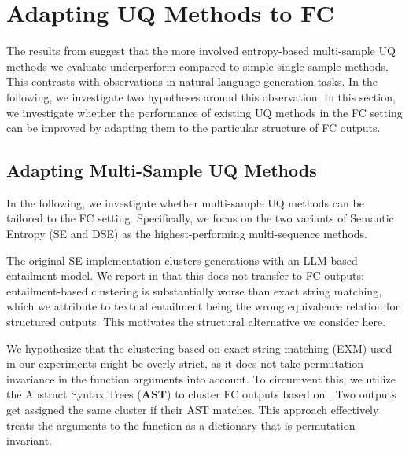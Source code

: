 \section{Adapting UQ Methods to FC}
\label{sec:discussion}


The results from  suggest that the more involved entropy-based multi-sample UQ methods we evaluate underperform compared to simple single-sample methods. 
This contrasts with observations in natural language generation tasks. 
In the following, we investigate two hypotheses around this observation. 
In this section, we investigate whether the performance of existing UQ methods in the FC setting can be improved by adapting them to the particular structure of FC outputs.









\subsection{Adapting Multi-Sample UQ Methods} 
\label{sec:SE_AST}

% 



In the following, we investigate whether multi-sample UQ methods can be tailored to the FC setting. Specifically, we focus on the two variants of Semantic Entropy (SE and DSE) as the highest-performing multi-sequence methods.

The original SE implementation clusters generations with an LLM-based entailment model. We report in  that this does not transfer to FC outputs: entailment-based clustering is substantially worse than exact string matching, which we attribute to textual entailment being the wrong equivalence relation for structured outputs. This motivates the structural alternative we consider here.

We hypothesize that the clustering based on exact string matching (EXM) used in our experiments might be overly strict, as it does not take permutation invariance in the function arguments into account.
To circumvent this, we utilize the Abstract Syntax Trees (\textbf{AST}) to cluster FC outputs based on \citet{bfcl}. Two outputs get assigned the same cluster if their AST matches. This approach effectively treats the arguments to the function as a dictionary that is permutation-invariant.

